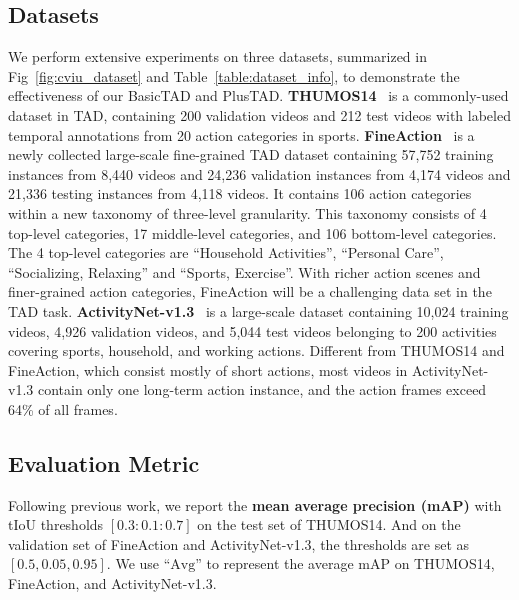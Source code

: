 \documentclass[a4paper,fleqn]{cas-dc}
\begin{document}
\subsection{Datasets}
We perform extensive experiments on three datasets, summarized in Fig~\ref{fig:cviu_dataset} and Table~\ref{table:dataset_info}, to demonstrate the effectiveness of our BasicTAD and PlusTAD. 
\textbf{THUMOS14}~\citep{THUMOS14} is a commonly-used dataset in TAD, containing 200 validation videos and 212 test videos with labeled temporal annotations from 20 action categories in sports. 
\textbf{FineAction}~\citep{fineaction} is a newly collected large-scale fine-grained TAD dataset containing 57,752 training instances from 8,440 videos and 24,236 validation instances from 4,174 videos and 21,336 testing instances from 4,118 videos. It contains 106 action categories within a new taxonomy of three-level granularity. This taxonomy consists of 4 top-level categories, 17 middle-level categories, and 106 bottom-level categories. The 4 top-level categories are ``Household Activities'', ``Personal Care'', ``Socializing, Relaxing'' and ``Sports, Exercise''. With richer action scenes and finer-grained action categories, FineAction will be a challenging data set in the TAD task.
\textbf{ActivityNet-v1.3}~\citep{anet} is a large-scale dataset containing 10,024 training videos, 4,926 validation videos, and 5,044 test videos belonging to 200 activities covering sports, household, and working actions. Different from THUMOS14 and FineAction, which consist mostly of short actions, most videos in ActivityNet-v1.3 contain only one long-term action instance, and the action frames exceed 64\% of all frames. 

\subsection{Evaluation Metric}
Following previous work, we report the \textbf{mean average precision (mAP)} with tIoU thresholds $[0.3:0.1:0.7]$ on the test set of THUMOS14.
And on the validation set of FineAction and ActivityNet-v1.3, the thresholds are set as $[0.5,0.05,0.95]$.
We use ``$\text{Avg}$'' to represent the average mAP on THUMOS14, FineAction, and ActivityNet-v1.3.

\noindent 
\end{document}

